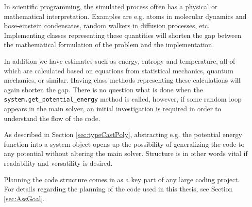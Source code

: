 In scientific programming, the simulated process often has a physical or mathematical interpretation. Examples are e.g. atoms in molecular dynamics and bose-einstein condensates, random walkers in diffusion processes, etc. Implementing classes representing these quantities will shorten the gap between the mathematical formulation of the problem and the implementation.

In addition we have estimates such as energy, entropy and temperature, all of which are calculated based on equations from statistical mechanics, quantum mechanics, or similar. Having class methods representing these calculations will again shorten the gap. There is no question what is done when the \verb+system.get_potential_energy+ method is called, however, if some random loop appears in the main solver, an initial investigation is required in order to understand the flow of the code.

As described in Section \ref{sec:typeCastPoly}, abstracting e.g. the potential energy function into a system object opens up the possibility of generalizing the code to any potential without altering the main solver. Structure is in other words vital if readability and versatility is desired. 

Planning the code structure comes in as a key part of any large coding project. For details regarding the planning of the code used in this thesis, see Section \ref{sec:AssGoal}.
